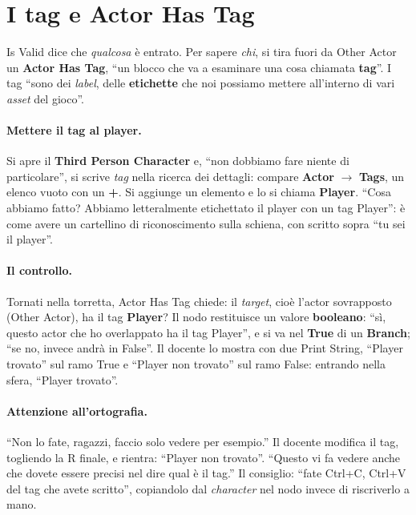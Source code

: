\section{I tag e Actor Has Tag}
\label{ue4:sec:tag}

Is Valid dice che \emph{qualcosa} è entrato. Per sapere \emph{chi}, si tira fuori da
Other Actor un \textbf{Actor Has Tag}, ``un blocco che va a esaminare una cosa chiamata
\textbf{tag}''. I tag ``sono dei \emph{label}, delle \textbf{etichette} che noi possiamo
mettere all'interno di vari \emph{asset} del gioco''.

\paragraph{Mettere il tag al player.} Si apre il \textbf{Third Person Character} e,
``non dobbiamo fare niente di particolare'', si scrive \emph{tag} nella ricerca dei
dettagli: compare \textbf{Actor} $\rightarrow$ \textbf{Tags}, un elenco vuoto con un
\textbf{+}. Si aggiunge un elemento e lo si chiama \textbf{Player}. ``Cosa abbiamo
fatto? Abbiamo letteralmente etichettato il player con un tag Player'': è come avere un
cartellino di riconoscimento sulla schiena, con scritto sopra ``tu sei il player''.

\paragraph{Il controllo.} Tornati nella torretta, Actor Has Tag chiede: il
\emph{target}, cioè l'actor sovrapposto (Other Actor), ha il tag \textbf{Player}? Il
nodo restituisce un valore \textbf{booleano}: ``sì, questo actor che ho overlappato ha
il tag Player'', e si va nel \textbf{True} di un \textbf{Branch}; ``se no, invece andrà
in False''. Il docente lo mostra con due Print String, ``Player trovato'' sul ramo True e
``Player non trovato'' sul ramo False: entrando nella sfera, ``Player trovato''.

\paragraph{Attenzione all'ortografia.} ``Non lo fate, ragazzi, faccio solo vedere per
esempio.'' Il docente modifica il tag, togliendo la R finale, e rientra: ``Player non
trovato''. ``Questo vi fa vedere anche che dovete essere precisi nel dire qual è il
tag.'' Il consiglio: ``fate Ctrl+C, Ctrl+V del tag che avete scritto'', copiandolo dal
\emph{character} nel nodo invece di riscriverlo a mano.


